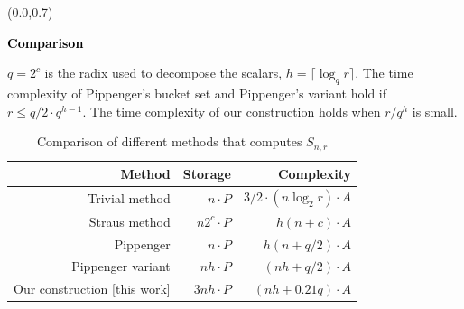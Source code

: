 \documentclass{beamer}                  %
\newcommand{\UW}[1]{\textbf{\textcolor{black}{#1}}}
\newcommand{\UWtitle}[1]{
	\begin{textblock}{12.8}(0.0,0.7)
		\begin{center} 
			\textbf{\UW{\Large{#1}}}
		\end{center}
	\end{textblock}
}
\newcommand{\fillframe}{\vspace*{10cm}}
\begin{document}
\begin{frame}
	\UWtitle{Comparison}
$q = 2^c$ is the radix used to decompose the scalars, $h=\lceil{\log_qr}\rceil$. The time complexity of Pippenger's bucket set and Pippenger's variant hold if $ r \le q/2\cdot q^{h-1}$. The time complexity of our construction holds when $r/q^h$ is small.

\begin{table}[H]
\renewcommand*{\arraystretch}{1.1}
\centering
\caption{Comparison of different methods that computes $S_{n,r}$}
\begin{tabularx}{\textwidth}{Rrr}
\toprule
{Method}   & {Storage} & { Complexity} \\ \midrule
Trivial method                   &     $n\cdot P$            &     ${3}/{2}\cdot (n\log_2{r})\cdot A$                        \\ 
Straus method     \cite{straus1964addition}                  &       $n 2^c\cdot P$          &        $h(n+c)\cdot A$       \\
Pippenger   \cite{pippenger1976evaluation,bernstein2012faster}      &      $n\cdot P$       &            $h(n+q/2)\cdot A$         \\ 
Pippenger variant \cite{brickell1995fast}  &    $ nh\cdot P$             &   $(nh+q/2)\cdot A$             \\

Our construction [this work]&    $ 3nh\cdot P$             &   $(nh+ 0.21 q)\cdot A$             \\ \bottomrule
\end{tabularx}%
\label{table_methods_comparison}
\end{table}
\end{frame}
\end{document}
